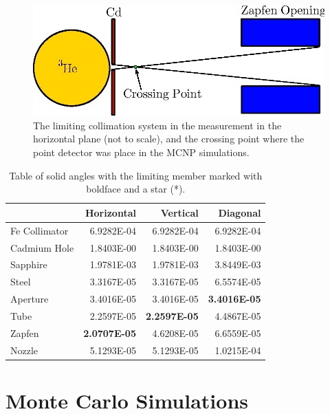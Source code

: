 \documentclass[preprint,12pt]{elsarticle}
\begin{document}
\begin{figure}[h!] 
  \centering
    \includegraphics[width=\columnwidth]{graphics/solid_angle.eps}
     \caption{The limiting collimation system in the measurement in the horizontal plane (not to scale), and the crossing point where the point detector was place in the MCNP simulations. \label{fig:solid_angle}}
\end{figure}

\begin{table}
\begin{center}
     \caption{Table of solid angles with the limiting member marked with boldface and a star (*).  \label{tab:sa} }
\begin{tabular}{|l|r|r|r|}
     \hline
                   &     Horizontal  &     Vertical   &     Diagonal   \\
     \hline
     Fe Collimator &     6.9282E-04  &     6.9282E-04 &     6.9282E-04 \\
     \hline 
     Cadmium Hole  &     1.8403E-00  &     1.8403E-00 &     1.8403E-00 \\
     \hline 
     Sapphire      &     1.9781E-03  &     1.9781E-03 &     3.8449E-03 \\
     \hline 
     Steel         &     3.3167E-05  &     3.3167E-05 &     6.5574E-05 \\
     \hline
     Aperture      &     3.4016E-05  &     3.4016E-05 &\bf* 3.4016E-05 \\
     \hline
     Tube          &     2.2597E-05  &\bf* 2.2597E-05 &    4.4867E-05  \\
     \hline
     Zapfen        &\bf* 2.0707E-05  &     4.6208E-05 &     6.6559E-05 \\
     \hline
     Nozzle        &     5.1293E-05  &     5.1293E-05 &     1.0215E-04 \\
     \hline
\end{tabular}
\end{center}
\end{table}


\section{Monte Carlo Simulations}
\label{sec:sim}
\end{document}

